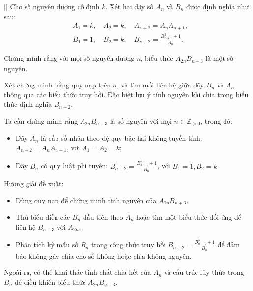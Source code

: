 \documentclass[../09-contruction-methods.tex]{subfiles}
\begin{document}
\begin{exercise*}\label{example:KOR-2015-FR-P1}[\textbf{}]
	Cho số nguyên dương cố định \( k \). Xét hai dãy số \( A_n \) và \( B_n \) được định nghĩa như sau:
	\begin{align*}
		&A_1 = k, \quad A_2 = k, \quad A_{n+2} = A_n A_{n+1}, \\
		&B_1 = 1, \quad B_2 = k, \quad B_{n+2} = \frac{B_{n+1}^3 + 1}{B_n}.
	\end{align*}
	
	Chứng minh rằng với mọi số nguyên dương \( n \), biểu thức \( A_{2n}B_{n+3} \) là một số nguyên.
\end{exercise*}

\begin{remark*}
	Xét chứng minh bằng quy nạp trên \( n \), và tìm mối liên hệ giữa dãy \( B_n \) và \( A_n \) thông qua các biểu thức truy hồi.
	Đặc biệt lưu ý tính nguyên khi chia trong biểu thức định nghĩa \( B_{n+2} \).
\end{remark*}

\begin{story*}
    Ta cần chứng minh rằng \( A_{2n}B_{n+3} \) là số nguyên với mọi \( n \in \mathbb{Z}_{>0} \), trong đó:
    \begin{itemize}[topsep=0pt, partopsep=0pt, itemsep=0pt]
        \item Dãy \( A_n \) là cấp số nhân theo đệ quy bậc hai không tuyến tính: \( A_{n+2} = A_n A_{n+1} \), với \( A_1 = A_2 = k \);
        \item Dãy \( B_n \) có quy luật phi tuyến: \( B_{n+2} = \frac{B_{n+1}^3 + 1}{B_n} \), với \( B_1 = 1, B_2 = k \).
    \end{itemize}
    
    Hướng giải đề xuất:
    \begin{itemize}[topsep=0pt, partopsep=0pt, itemsep=0pt]
        \item Dùng quy nạp để chứng minh tính nguyên của \( A_{2n}B_{n+3} \).
        \item Thử biểu diễn các \( B_n \) đầu tiên theo \( A_n \) hoặc tìm một biểu thức đối ứng để liên hệ \( B_{n+3} \) với \( A_{2n} \).
        \item Phân tích kỹ mẫu số \( B_n \) trong công thức truy hồi \( B_{n+2} = \frac{B_{n+1}^3 + 1}{B_n} \) để đảm bảo không gây chia cho số không hoặc chia không nguyên.
    \end{itemize}
    Ngoài ra, có thể khai thác tính chất chia hết của \( A_n \) và cấu trúc lũy thừa trong \( B_n \) để điều khiển biểu thức \( A_{2n}B_{n+3} \).
\end{story*}
\end{document}
